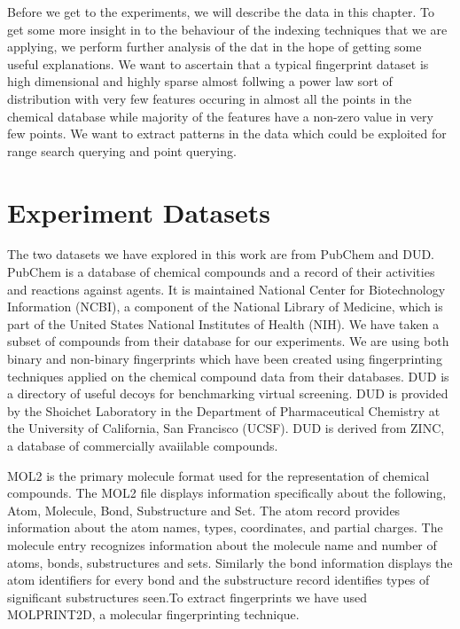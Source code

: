 Before we get to the experiments, we will describe the data in this chapter. To get some more insight in to the behaviour of the indexing techniques that we are applying, we perform further analysis of the dat in the hope of getting some useful explanations. We want to ascertain that a typical fingerprint dataset is high dimensional and highly sparse almost follwing a power law sort of distribution with very few features occuring in almost all the points in the chemical database while majority of the features have a non-zero value in very few points. We want to extract patterns in the data which could be exploited for range search querying and point querying.\\

\section{Experiment Datasets}

The two datasets we have explored in this work are from PubChem and DUD. PubChem is a database of chemical compounds and a record of their activities and reactions against agents. It is maintained National Center for Biotechnology Information (NCBI), a component of the National Library of Medicine, which is part of the United States National Institutes of Health (NIH). We have taken a subset of compounds from their database for our experiments. We are using both binary and non-binary fingerprints which have been created using fingerprinting techniques applied on the chemical compound data from their databases. DUD is a directory of useful decoys for benchmarking virtual screening. DUD is provided by the Shoichet Laboratory in the Department of Pharmaceutical Chemistry at the University of California, San Francisco (UCSF). DUD is derived from ZINC, a database of commercially avaiilable compounds. 

MOL2 is the primary molecule format used for the representation of chemical compounds. The MOL2 file displays information specifically about the following, Atom, Molecule, Bond, Substructure and Set. The atom record provides information about the atom names, types, coordinates, and partial charges. The molecule entry recognizes information about the molecule name and number of atoms, bonds, substructures and sets. Similarly the bond information displays the atom identifiers for every bond and the substructure record identifies types of significant substructures seen.To extract fingerprints we have used MOLPRINT2D, a molecular fingerprinting technique.

